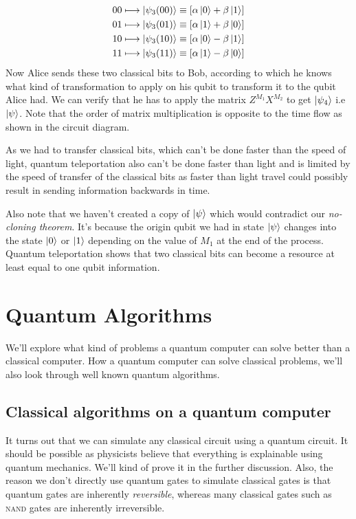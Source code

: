 \begin{align}
    00 &\longmapsto \ket{\psi_3(00)} \equiv \left[ \alpha\ket{0} + \beta\ket{1} \right] \\
    01 &\longmapsto \ket{\psi_3(01)} \equiv \left[ \alpha\ket{1} + \beta\ket{0} \right] \\
    10 &\longmapsto \ket{\psi_3(10)} \equiv \left[ \alpha\ket{0} - \beta\ket{1} \right] \\
    11 &\longmapsto \ket{\psi_3(11)} \equiv \left[ \alpha\ket{1} - \beta\ket{0} \right] 
\end{align}
Now Alice sends these two classical bits to Bob, according to which he knows what kind of transformation to apply on his qubit to transform it to the qubit Alice had. We can verify that he has to apply the matrix $Z^{M_1}X^{M_2}$ to get $\ket{\psi_4}$ i.e $\ket{\psi}$. Note that the order of matrix multiplication is opposite to the time flow as shown in the circuit diagram.

As we had to transfer classical bits, which can't be done faster than the speed of light, quantum teleportation also can't be done faster than light and is limited by the speed of transfer of the classical bits as faster than light travel could possibly result in sending information backwards in time.

Also note that we haven't created a copy of $\ket{\psi}$ which would contradict our \textit{no-cloning theorem}. It's because the origin qubit we had in state $\ket{\psi}$ changes into the state $\ket{0}$ or $\ket{1}$ depending on the value of $M_1$ at the end of the process. Quantum teleportation shows that two classical bits can become a resource at least equal to one qubit information.

\section{Quantum Algorithms}
We'll explore what kind of problems a quantum computer can solve better than a classical computer. How a quantum computer can solve classical problems, we'll also look through well known quantum algorithms.

\subsection{Classical algorithms on a quantum computer}
It turns out that we can simulate any classical circuit using a quantum circuit. It should be possible as physicists believe that everything is explainable using quantum mechanics. We'll kind of prove it in the further discussion. Also, the reason we don't directly use quantum gates to simulate classical gates is that quantum gates are inherently \textit{reversible}, whereas many classical gates such as \textsc{nand} gates are inherently irreversible.

